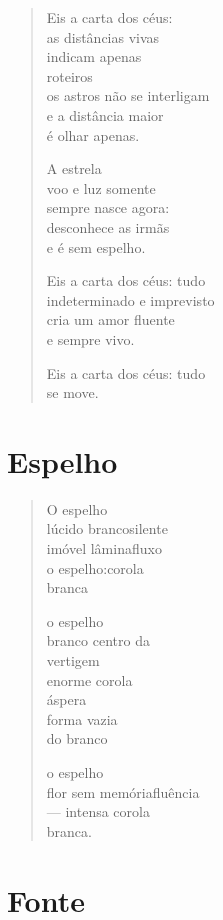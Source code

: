 \begin{verse}
Eis a carta dos céus:\\
as distâncias vivas\\
indicam apenas\\
roteiros\\
os astros não se interligam\\
e a distância maior\\
é olhar apenas.

A estrela\\
voo e luz somente\\
sempre nasce agora:\\
desconhece as irmãs\\
e é sem espelho.

Eis a carta dos céus: tudo\\
indeterminado e imprevisto\\
cria um amor fluente\\
e sempre vivo.

Eis a carta dos céus: tudo\\
\qquad\qquad\qquad\qquad se move.
\end{verse}


\chapter{Espelho}

\begin{verse}
O espelho\\
lúcido branco\qquad silente\\
imóvel lâmina\qquad fluxo\\
o espelho:\qquad\qquad corola\\
\qquad\qquad\qquad\qquad branca

o espelho\\
branco centro da\\
\qquad\qquad\qquad\qquad vertigem\\
enorme corola\\
\qquad\qquad\qquad\qquad áspera\\
forma vazia\\
do branco

o espelho\\
flor sem memória\qquad fluência\\
--- intensa corola\\
\quad branca.
\end{verse}


\chapter{Fonte}

